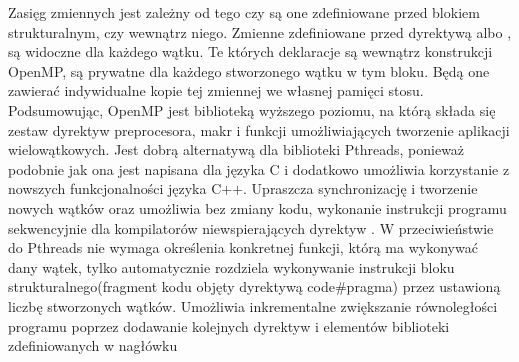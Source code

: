 \documentclass[document.tex]{subfiles}
\begin{document}
\indent Zasięg zmiennych jest zależny od tego czy są one zdefiniowane przed blokiem strukturalnym, czy wewnątrz niego. Zmienne zdefiniowane przed dyrektywą 
albo , są widoczne dla każdego wątku. Te których deklaracje są wewnątrz
konstrukcji OpenMP, są prywatne dla każdego stworzonego wątku w tym bloku.
Będą one zawierać indywidualne kopie tej zmiennej we własnej pamięci stosu.
\cite{openmp_pacheco}\cite{openmp_spec}
\\
\indent Podsumowując, OpenMP jest biblioteką wyższego poziomu, na którą składa się
zestaw dyrektyw preprocesora, makr i funkcji umożliwiających tworzenie aplikacji
wielowątkowych. Jest dobrą alternatywą dla biblioteki Pthreads, ponieważ podobnie jak
ona jest napisana dla języka C i dodatkowo umożliwia korzystanie z nowszych funkcjonalności
języka C++. Upraszcza synchronizację i tworzenie nowych wątków oraz umożliwia bez zmiany
kodu, wykonanie instrukcji programu sekwencyjnie dla kompilatorów niewspierających dyrektyw . W przeciwieństwie do Pthreads nie wymaga określenia konkretnej funkcji,
którą ma wykonywać dany wątek, tylko automatycznie rozdziela wykonywanie instrukcji bloku
strukturalnego(fragment kodu objęty dyrektywą code{\#pragma}) przez ustawioną liczbę stworzonych wątków. Umożliwia inkrementalne zwiększanie
równoległości programu poprzez dodawanie kolejnych dyrektyw i elementów biblioteki zdefiniowanych w nagłówku 


\clearpage
\end{document}
